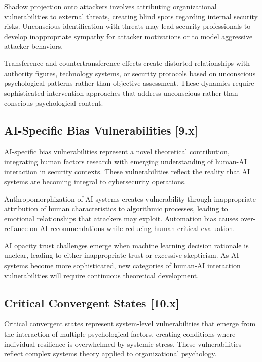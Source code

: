 \documentclass[11pt,a4paper]{article}
\begin{document}
Shadow projection onto attackers involves attributing organizational vulnerabilities to external threats, creating blind spots regarding internal security risks. Unconscious identification with threats may lead security professionals to develop inappropriate sympathy for attacker motivations or to model aggressive attacker behaviors.

Transference and countertransference effects create distorted relationships with authority figures, technology systems, or security protocols based on unconscious psychological patterns rather than objective assessment. These dynamics require sophisticated intervention approaches that address unconscious rather than conscious psychological content.

\subsection{AI-Specific Bias Vulnerabilities [9.x]}

AI-specific bias vulnerabilities represent a novel theoretical contribution, integrating human factors research with emerging understanding of human-AI interaction in security contexts. These vulnerabilities reflect the reality that AI systems are becoming integral to cybersecurity operations.

Anthropomorphization of AI systems creates vulnerability through inappropriate attribution of human characteristics to algorithmic processes, leading to emotional relationships that attackers may exploit. Automation bias causes over-reliance on AI recommendations while reducing human critical evaluation.

AI opacity trust challenges emerge when machine learning decision rationale is unclear, leading to either inappropriate trust or excessive skepticism. As AI systems become more sophisticated, new categories of human-AI interaction vulnerabilities will require continuous theoretical development.

\subsection{Critical Convergent States [10.x]}

Critical convergent states represent system-level vulnerabilities that emerge from the interaction of multiple psychological factors, creating conditions where individual resilience is overwhelmed by systemic stress. These vulnerabilities reflect complex systems theory applied to organizational psychology.
\end{document}
